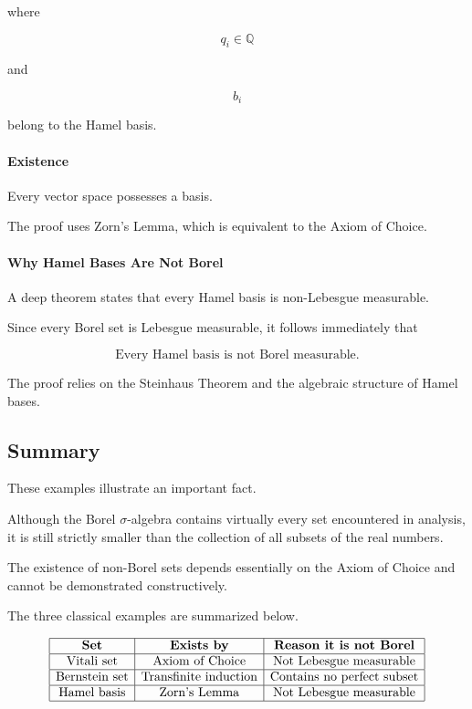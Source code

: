 \documentclass[11pt]{article}
\begin{document}
	where
	
	\[
	q_i\in\mathbb Q
	\]
	
	and
	
	\[
	b_i
	\]
	
	belong to the Hamel basis.
	
	
	\paragraph{Existence}
	
	Every vector space possesses a basis.
	
	The proof uses Zorn's Lemma, which is equivalent to the Axiom of Choice.
	
	
	\paragraph{Why Hamel Bases Are Not Borel}
	
	A deep theorem states that every Hamel basis is non-Lebesgue measurable.
	
	Since every Borel set is Lebesgue measurable, it follows immediately that
	
	\[
	\boxed{
		\text{Every Hamel basis is not Borel measurable.}
	}
	\]
	
	The proof relies on the Steinhaus Theorem and the algebraic structure of
	Hamel bases.
	
	
	\subsection{Summary}
	
	These examples illustrate an important fact.
	
	Although the Borel $\sigma$-algebra contains virtually every set encountered
	in analysis, it is still strictly smaller than the collection of all subsets
	of the real numbers.
	
	The existence of non-Borel sets depends essentially on the Axiom of Choice
	and cannot be demonstrated constructively.
	
	The three classical examples are summarized below.
	
	\[
	\begin{array}{|c|c|c|}
		\hline
		\textbf{Set} &
		\textbf{Exists by} &
		\textbf{Reason it is not Borel}
		\\
		\hline
		\text{Vitali set}
		&
		\text{Axiom of Choice}
		&
		\text{Not Lebesgue measurable}
		\\
		\hline
		\text{Bernstein set}
		&
		\text{Transfinite induction}
		&
		\text{Contains no perfect subset}
		\\
		\hline
		\text{Hamel basis}
		&
		\text{Zorn's Lemma}
		&
		\text{Not Lebesgue measurable}
		\\
		\hline
	\end{array}
	\]
	
\end{document}
